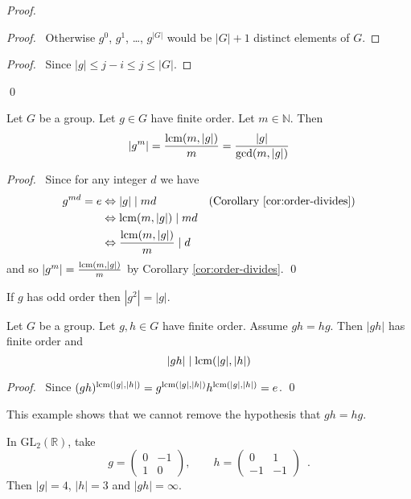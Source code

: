 \begin{proof}
    \pf
    \begin{proof}
        \pf\ Otherwise $g^0$, $g^1$, \ldots, $g^{|G|}$ would be $|G| + 1$ distinct elements of $G$.
    \end{proof}
    \begin{proof}
        \pf\ Since $|g| \leq j - i \leq j \leq |G|$.
    \end{proof}
    \qed
\end{proof}

\begin{prop}
\label{prop:order-of-g-to-the-m}
    Let $G$ be a group. Let $g \in G$ have finite order. Let $m \in \mathbb{N}$. Then
    \[ |g^m| = \frac{\operatorname{lcm}(m,|g|)}{m} = \frac{|g|}{\gcd(m,|g|)}\]
\end{prop}

\begin{proof}
    \pf\ Since for any integer $d$ we have
    \begin{align*}
        g^{md} = e & \Leftrightarrow |g| \mid md                  & (\text{Corollary \ref{cor:order-divides}}) \\
                   & \Leftrightarrow \operatorname{lcm}(m,|g|) \mid md                                                       \\
                   & \Leftrightarrow \frac{\operatorname{lcm}(m,|g|)}{m} \mid d & \relax
    \end{align*}
    and so $|g^m| = \frac{\operatorname{lcm}(m,|g|)}{m}$ by Corollary \ref{cor:order-divides}. \qed
\end{proof}

\begin{cor}
    If $g$ has odd order then $|g^2| = |g|$.
\end{cor}

\begin{prop}
    \label{prop:order-gh}
    Let $G$ be a group. Let $g,h \in G$ have finite order. Assume $gh = hg$. Then $|gh|$ has finite order and
    \[ |gh| \mid \operatorname{lcm}(|g|,|h|)\]
\end{prop}

\begin{proof}
    \pf\ Since $(gh)^{\operatorname{lcm}(|g|,|h|)} = g^{\operatorname{lcm}(|g|,|h|)}h^{\operatorname{lcm}(|g|,|h|)} = e$. \qed
\end{proof}

\begin{ex}
    This example shows that we cannot remove the hypothesis that $gh = hg$.

    In $\mathrm{GL}_2(\mathbb{R})$, take
    \[ g = \left( \begin{array}{cc} 0 & -1 \\ 1 & 0 \end{array} \right), \qquad
        h = \left( \begin{array}{cc} 0 & 1 \\ -1 & -1 \end{array} \right) \enspace . \]
    Then $|g| = 4$, $|h| = 3$ and $|gh| = \infty$.
\end{ex}

